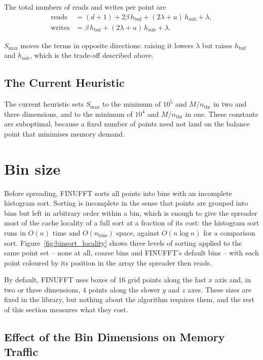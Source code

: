 The total numbers of reads and writes per point are
\begin{align}
    \mathrm{reads}  &= (d + 1) + 2\beta\, h_{\mathrm{buf}} + (2\lambda + u)\, h_{\mathrm{sub}} + \lambda, \label{eq:spread_reads}\\
    \mathrm{writes} &= \beta\, h_{\mathrm{buf}} + (2\lambda + u)\, h_{\mathrm{sub}} + \lambda. \label{eq:spread_writes}
\end{align}

$S_{\max}$ moves the terms in opposite directions: raising it lowers $\lambda$ but raises $h_{\mathrm{buf}}$ and $h_{\mathrm{sub}}$, which is the trade-off described above.

\subsection{The Current Heuristic}
The current heuristic sets $S_{\max}$ to the minimum of $10^5$ and $M/n_{\text{thr}}$ in two and three dimensions, and to the minimum of $10^4$ and $M/n_{\text{thr}}$ in one. These constants are suboptimal, because a fixed number of points need not land on the balance point that minimises memory demand. 
\section{Bin size}

Before spreading, FINUFFT sorts all points into bins with an incomplete histogram sort. Sorting is incomplete in the sense that points are grouped into bins but left in arbitrary order within a bin, which is enough to give the spreader most of the cache locality of a full sort at a fraction of its cost: the histogram sort runs in $O(n)$ time and $O(n_{\mathrm{bins}})$ space, against $O(n \log n)$ for a comparison sort. Figure~\ref{fig:binsort_locality} shows three levels of sorting applied to the same point set -- none at all, coarse bins and FINUFFT's default bins -- with each point coloured by its position in the array the spreader then reads.

By default, FINUFFT uses boxes of $16$ grid points along the fast $x$ axis and, in two or three dimensions, $4$ points along the slower $y$ and $z$ axes. These sizes are fixed in the library, but nothing about the algorithm requires them, and the rest of this section measures what they cost.
\subsection{Effect of the Bin Dimensions on Memory Traffic}

